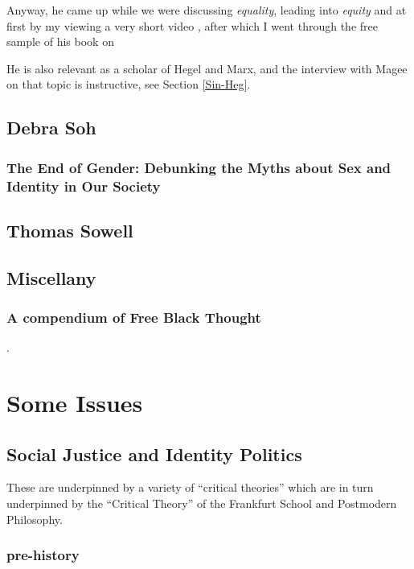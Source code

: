 \documentclass[10pt,titlepage]{book}
\begin{document}
Anyway, he came up while we were discussing \emph{equality}, leading into \emph{equity} and at first by my viewing a very short video \cite{singer-eqvid}, after which I went through the free sample of his book on

He is also relevant as a scholar of Hegel and Marx, and the interview with Magee on that topic \cite{magee-singer} is instructive, see Section \ref{Sin-Heg}.

\section{Debra Soh}

\subsection{The End of Gender: Debunking the Myths about
Sex and Identity in Our Society \cite{soh-end}}

\section{Thomas Sowell}

\cite{sowell-barbarians}


\section{Miscellany}

\subsection{A compendium of Free Black Thought \cite{free-black-thought}}.

\chapter{Some Issues}

\section{Social Justice and Identity Politics}

These are underpinned by a variety of ``critical theories'' which are in turn underpinned by the ``Critical Theory'' of the Frankfurt School and Postmodern Philosophy.

\subsection{pre-history}
\end{document}
